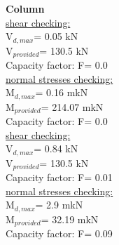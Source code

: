 \textbf{Column} \\
\underline{shear checking:} \\
V$_{d,max}$= 0.05 kN \\ V$_{provided}$= 130.5 kN \\ Capacity factor: F= 0.0 \\
\underline{normal stresses checking:} \\
M$_{d,max}$= 0.16 mkN \\ M$_{provided}$= 214.07 mkN \\ Capacity factor: F= 0.0 \\
\underline{shear checking:} \\
V$_{d,max}$= 0.84 kN \\ V$_{provided}$= 130.5 kN \\ Capacity factor: F= 0.01 \\
\underline{normal stresses checking:} \\
M$_{d,max}$= 2.9 mkN \\ M$_{provided}$= 32.19 mkN \\ Capacity factor: F= 0.09 \\
